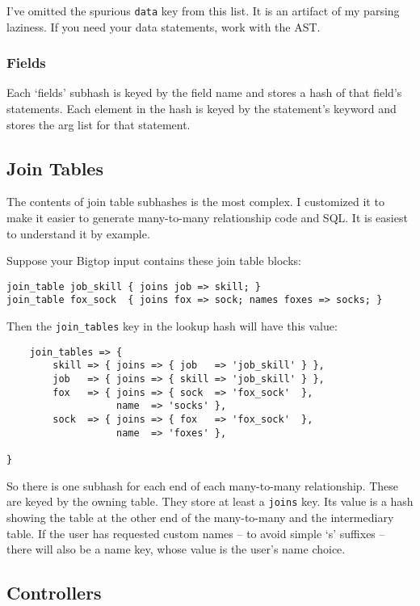 I've omitted the spurious \verb+data+ key from this list.  It is an artifact
of my parsing laziness.  If you need your data statements, work with the AST.

\subsubsection*{Fields}

Each `fields' subhash is keyed by the field name and stores a hash of that
field's statements.  Each element in the hash is keyed by the statement's
keyword and stores the arg list for that statement.

\subsection*{Join Tables}

The contents of join table subhashes is the most complex.  I customized
it to make it easier to generate many-to-many relationship code and SQL.
It is easiest to understand it by example.

Suppose your Bigtop input contains these join table blocks:

\begin{verbatim}
join_table job_skill { joins job => skill; }
join_table fox_sock  { joins fox => sock; names foxes => socks; }
\end{verbatim}

Then the \verb+join_tables+ key in the lookup hash will have this value:

\begin{verbatim}
    join_tables => {
        skill => { joins => { job   => 'job_skill' } },
        job   => { joins => { skill => 'job_skill' } },
        fox   => { joins => { sock  => 'fox_sock'  },
                   name  => 'socks' },
        sock  => { joins => { fox   => 'fox_sock'  },
                   name  => 'foxes' },
                                                                                  }
\end{verbatim}

So there is one subhash for each end of each many-to-many relationship.
These are keyed by the owning table.  They store at least a \verb+joins+
key.  Its value is a hash showing the table at the other end of the
many-to-many and the intermediary table.  If the user has requested
custom names -- to avoid simple `s' suffixes -- there will also be a
name key, whose value is the user's name choice.

\subsection*{Controllers}


